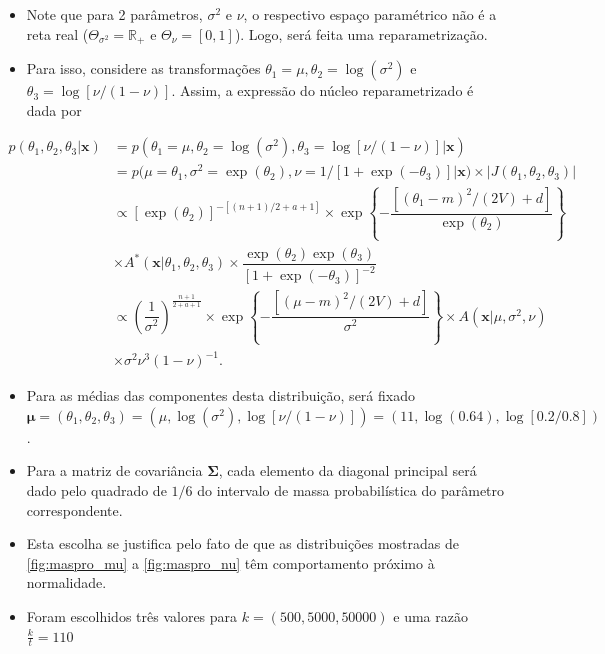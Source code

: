 \documentclass[9pt]{beamer}
\begin{document}
\begin{frame}
\begin{itemize}
\justifying	
\item Note que para 2 parâmetros, $\sigma^2$ e $\nu$, o respectivo espaço paramétrico não é a reta real ($\Theta_{\sigma^2} = \mathbb{R}_+$ e $\Theta_{\nu} = [0,1]$). Logo, será feita uma reparametrização.
\item Para isso, considere as transformações $\theta_1 = \mu, \theta_2 = \log(\sigma^2)$ e $\theta_3 = \log[\nu/(1-\nu)]$. Assim, a expressão do núcleo reparametrizado é dada por
\end{itemize}
\small
\begin{align}
p(\theta_1, \theta_2, \theta_3 | \bm{x})
&= p(\theta_1 = \mu, \theta_2 = \log(\sigma^2), \theta_3 = \log[\nu/(1-\nu)] | \bm{x}) \nonumber \\
&= p(\mu = \theta_1, \sigma^2 = \exp(\theta_2), \nu = 1/[1 + \exp(-\theta_3)] | \bm{x}) \times |J(\theta_1, \theta_2, \theta_3)| \nonumber \\
&\propto \left[\exp(\theta_2)\right]^{-[(n + 1)/2 + a + 1]} \times \exp\left\{-\dfrac{\left[(\theta_1 - m)^2 / (2V) + d\right]}{\exp(\theta_2)}\right\} \nonumber \\
&\times A^*(\bm{x} | \theta_1, \theta_2, \theta_3) \times  \dfrac{\exp(\theta_2) \exp(\theta_3)}{\left[1 + \exp(-\theta_3)\right]^{-2}} \nonumber \\	&\propto \left(\dfrac{1}{\sigma^2}\right)^{\frac{n + 1}{2 + a + 1}} \times \exp\left\{-\dfrac{\left[(\mu - m)^2 / (2V) + d\right]}{\sigma^2}\right\} \times A(\bm{x} | \mu, \sigma^2, \nu) \nonumber \\
&\times \sigma^2 \nu^3(1-\nu)^{-1}. \label{eq:sir_dpre}
\end{align}
\end{frame}
\begin{frame}
\begin{itemize}
\justifying	

\item Para as médias das componentes desta distribuição, será fixado $\bm{\mu} = (\theta_1, \theta_2, \theta_3) = (\mu, \log(\sigma^2), \log[\nu/(1-\nu)]) = (11, \log(0.64), \log[0.2/0.8])$.
\item Para a matriz de covariância $\bm{\Sigma}$, cada elemento da diagonal principal será dado pelo quadrado de $1/6$ do intervalo de massa probabilística do parâmetro correspondente.
\item Esta escolha se justifica pelo fato de que as distribuições mostradas de \ref{fig:maspro_mu} a \ref{fig:maspro_nu} têm comportamento próximo à normalidade.
\item Foram escolhidos três valores para $k = (500, 5000, 50000)$ e uma razão $\frac{k}{t}={1}{10}$
\end{itemize}
\end{frame}
\end{document}
